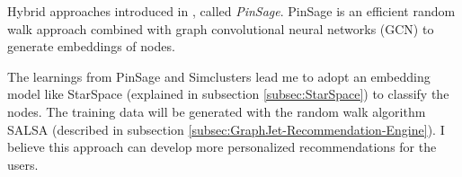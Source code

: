 Hybrid approaches introduced in \cite{ying2018graph}, called \emph{PinSage}. PinSage is an efficient random walk approach combined with graph convolutional neural networks (GCN) to generate embeddings of nodes.


The learnings from PinSage and Simclusters lead me to adopt an embedding model like StarSpace (explained in subsection \ref{subsec:StarSpace}) to classify the nodes. The training data will be generated with the random walk algorithm SALSA (described in subsection \ref{subsec:GraphJet-Recommendation-Engine}). I believe this approach can develop more personalized recommendations for the users.
